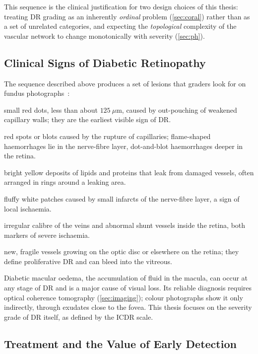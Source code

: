 This sequence is the clinical justification for two design choices of this thesis:
treating DR grading as an inherently \emph{ordinal} problem (\cref{sec:coral}) rather
than as a set of unrelated categories, and expecting the \emph{topological} complexity of
the vascular network to change monotonically with severity (\cref{sec:ph}).

\subsection{Clinical Signs of Diabetic Retinopathy}
\label{sec:signs}

The sequence described above produces a set of lesions that graders look for on
fundus photographs~\cite{wong2016dr,antonetti2012dr}:
\begin{description}[style=nextline,leftmargin=1.2em]
\item[Microaneurysms] small red dots, less than about $125~\mu$m, caused by out-pouching
of weakened capillary walls; they are the earliest visible sign of DR.
\item[Haemorrhages] red spots or blots caused by the rupture of capillaries; flame-shaped
haemorrhages lie in the nerve-fibre layer, dot-and-blot haemorrhages deeper in the retina.
\item[Hard exudates] bright yellow deposits of lipids and proteins that leak from damaged
vessels, often arranged in rings around a leaking area.
\item[Cotton-wool spots] fluffy white patches caused by small infarcts of the nerve-fibre
layer, a sign of local ischaemia.
\item[Venous beading and IRMA] irregular calibre of the veins and abnormal shunt vessels
inside the retina, both markers of severe ischaemia.
\item[Neovascularisation] new, fragile vessels growing on the optic disc or elsewhere on the
retina; they define proliferative DR and can bleed into the vitreous.
\end{description}
Diabetic macular oedema, the accumulation of fluid in the macula, can occur at any stage
of DR and is a major cause of visual loss. Its reliable diagnosis requires optical
coherence tomography (\cref{sec:imaging}); colour photographs show it only indirectly,
through exudates close to the fovea. This thesis focuses on the severity grade of DR
itself, as defined by the ICDR scale.

\subsection{Treatment and the Value of Early Detection}


